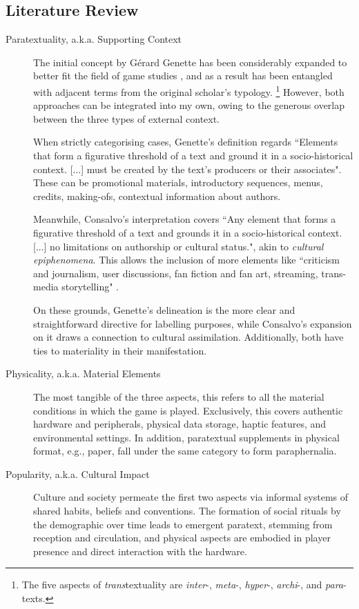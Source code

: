\documentclass[12pt]{article}
\begin{document}
\subsection{Literature Review}
\begin{description}    
    \item[Paratextuality, a.k.a. Supporting Context]
        The initial concept by G\'{e}rard Genette \parencite*{genette} has been considerably expanded to better fit the field of game studies \parencite{consalvo}, and as a result has been entangled with adjacent terms from the original scholar's typology.
        \footnote{The five aspects of \textit{trans}textuality are \textit{inter}-, \textit{meta}-, \textit{hyper}-, \textit{archi}-, and \textit{para}-texts.}
        However, both approaches can be integrated into my own, owing to the generous overlap between the three types of external context.\par
        When strictly categorising cases, Genette's definition regards ``Elements that form a figurative threshold of a text and ground it in a socio-historical context. [...] must be created by the text’s producers or their associates".
        These can be promotional materials, introductory sequences, menus, credits, making-ofs, contextual information about authors.\par
        Meanwhile, Consalvo's interpretation covers ``Any element that forms a figurative threshold of a text and grounds it in a socio-historical context. [...] no limitations on authorship or cultural status.", akin to \textit{cultural epiphenomena}.
        This allows the inclusion of more elements like ``criticism and journalism, user discussions, fan fiction and fan art, streaming, trans-media storytelling" \parencite{svelch}.\par
        On these grounds, Genette's delineation is the more clear and straightforward directive for labelling purposes, while Consalvo's expansion on it draws a connection to cultural assimilation.
        Additionally, both have ties to materiality in their manifestation.
    \item[Physicality, a.k.a. Material Elements] 
        The most tangible of the three aspects, this refers to all the material conditions in which the game is played.
        Exclusively, this covers authentic hardware and peripherals, physical data storage, haptic features, and environmental settings.
        In addition, paratextual supplements in physical format, e.g., paper, fall under the same category to form paraphernalia.
    \item[Popularity, a.k.a. Cultural Impact] 
        Culture and society permeate the first two aspects via informal systems of shared habits, beliefs and conventions.
        The formation of social rituals by the demographic over time leads to emergent paratext, stemming from reception and circulation, and physical aspects are embodied in player presence and direct interaction with the hardware.
\end{description}
\end{document}
